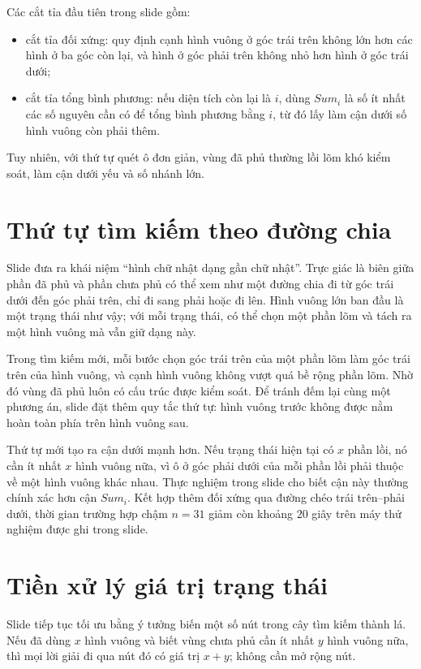 \documentclass[11pt]{article}
\begin{document}
Các cắt tỉa đầu tiên trong slide gồm:
\begin{itemize}
  \item cắt tỉa đối xứng: quy định cạnh hình vuông ở góc trái trên không lớn
  hơn các hình ở ba góc còn lại, và hình ở góc phải trên không nhỏ hơn hình
  ở góc trái dưới;
  \item cắt tỉa tổng bình phương: nếu diện tích còn lại là \(i\), dùng
  \(Sum_i\) là số ít nhất các số nguyên cần có để tổng bình phương bằng
  \(i\), từ đó lấy làm cận dưới số hình vuông còn phải thêm.
\end{itemize}

Tuy nhiên, với thứ tự quét ô đơn giản, vùng đã phủ thường lồi lõm khó kiểm
soát, làm cận dưới yếu và số nhánh lớn.

\section{Thứ tự tìm kiếm theo đường chia}

Slide đưa ra khái niệm ``hình chữ nhật dạng gần chữ nhật''. Trực giác là biên
giữa phần đã phủ và phần chưa phủ có thể xem như một đường chia đi từ góc
trái dưới đến góc phải trên, chỉ đi sang phải hoặc đi lên. Hình vuông lớn ban
đầu là một trạng thái như vậy; với mỗi trạng thái, có thể chọn một phần lõm
và tách ra một hình vuông mà vẫn giữ dạng này.

Trong tìm kiếm mới, mỗi bước chọn góc trái trên của một phần lõm làm góc
trái trên của hình vuông, và cạnh hình vuông không vượt quá bề rộng phần lõm.
Nhờ đó vùng đã phủ luôn có cấu trúc được kiểm soát. Để tránh đếm lại cùng
một phương án, slide đặt thêm quy tắc thứ tự: hình vuông trước không được nằm
hoàn toàn phía trên hình vuông sau.

Thứ tự mới tạo ra cận dưới mạnh hơn. Nếu trạng thái hiện tại có \(x\) phần
lồi, nó cần ít nhất \(x\) hình vuông nữa, vì ô ở góc phải dưới của mỗi phần
lồi phải thuộc về một hình vuông khác nhau. Thực nghiệm trong slide cho biết
cận này thường chính xác hơn cận \(Sum_i\). Kết hợp thêm đối xứng qua đường
chéo trái trên--phải dưới, thời gian trường hợp chậm \(n=31\) giảm còn
khoảng \(20\) giây trên máy thử nghiệm được ghi trong slide.

\section{Tiền xử lý giá trị trạng thái}

Slide tiếp tục tối ưu bằng ý tưởng biến một số nút trong cây tìm kiếm thành
lá. Nếu đã dùng \(x\) hình vuông và biết vùng chưa phủ cần ít nhất \(y\) hình
vuông nữa, thì mọi lời giải đi qua nút đó có giá trị \(x+y\); không cần mở
rộng nút.
\end{document}
